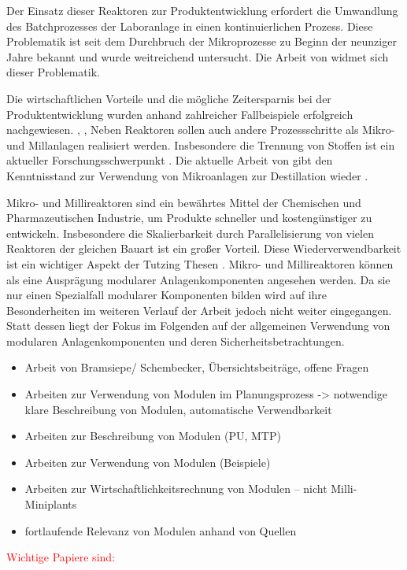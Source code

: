 Der Einsatz dieser Reaktoren zur Produktentwicklung erfordert die Umwandlung des Batchprozesses der Laboranlage in einen kontinuierlichen Prozess. Diese Problematik ist seit dem Durchbruch der Mikroprozesse zu Beginn der neunziger Jahre bekannt und wurde weitreichend untersucht. \cite{Helling_2012} Die Arbeit von \citeauthor{Hugo_2009} widmet sich dieser Problematik. \cite{Hugo_2009} 

Die wirtschaftlichen Vorteile und die m\"ogliche Zeitersparnis bei der Produktentwicklung wurden anhand zahlreicher Fallbeispiele erfolgreich nachgewiesen. \cite{Brodhagen_2012}, \cite{Behr_2012}, \cite{Grundemann_2012} Neben Reaktoren sollen auch andere Prozessschritte als Mikro- und Millanlagen realisiert werden. Insbesondere die Trennung von Stoffen ist ein aktueller Forschungsschwerpunkt \cite{Helling_2012}. Die aktuelle Arbeit von \citeauthor{Yang_2017} gibt den Kenntnisstand zur Verwendung von Mikroanlagen zur Destillation wieder \cite{Yang_2017}.

Mikro- und Millireaktoren sind ein bew\"ahrtes Mittel der Chemischen und Pharmazeutischen Industrie, um Produkte schneller und kosteng\"unstiger zu entwickeln. Insbesondere die Skalierbarkeit durch Parallelisierung von vielen Reaktoren der gleichen Bauart ist ein gro\ss{}er Vorteil. Diese Wiederverwendbarkeit ist ein wichtiger Aspekt der Tutzing Thesen \cite{Processnet_2009}. Mikro- und Millireaktoren k\"onnen als eine Auspr\"agung modularer Anlagenkomponenten angesehen werden. Da sie nur einen Spezialfall modularer Komponenten bilden wird auf ihre Besonderheiten im weiteren Verlauf der Arbeit jedoch nicht weiter eingegangen. Statt dessen liegt der Fokus im Folgenden auf der allgemeinen Verwendung von modularen Anlagenkomponenten und deren Sicherheitsbetrachtungen.   

\begin{itemize}
\item Arbeit von Bramsiepe/ Schembecker, \"Ubersichtsbeitr\"age, offene Fragen
\item Arbeiten zur Verwendung von Modulen im Planungsprozess -> notwendige klare Beschreibung von Modulen, automatische Verwendbarkeit
\item Arbeiten zur Beschreibung von Modulen (PU, MTP)
\item Arbeiten zur Verwendung von Modulen (Beispiele)
\item Arbeiten zur Wirtschaftlichkeitsrechnung von Modulen -- nicht Milli- Miniplants
\item fortlaufende Relevanz von Modulen anhand von Quellen
\end{itemize}
\textcolor{red}{Wichtige Papiere sind: \cite{ne_148}}

